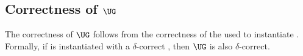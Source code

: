     \subsection{Correctness of $\UG$}
    The correctness of $\UG$ follows from the correctness of the
    \kem used to instantiate \ug.
    Formally, if \ug is instantiated with a $\delta$-correct \kem, then $\UG$ is also $\delta$-correct.
